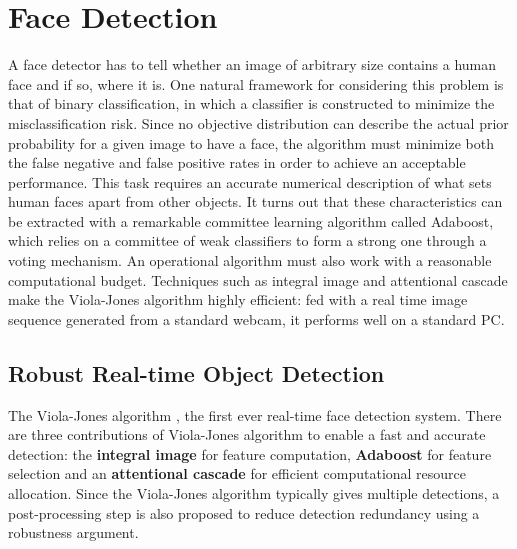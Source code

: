 \chapter{Face Detection} %

\label{Chapter4} %


A face detector has to tell whether an image of arbitrary size contains a human face and if so, where
it is. One natural framework for considering this problem is that of binary classification, in which
a classifier is constructed to minimize the misclassification risk. Since no objective distribution can
describe the actual prior probability for a given image to have a face, the algorithm must minimize
both the false negative and false positive rates in order to achieve an acceptable performance.
This task requires an accurate numerical description of what sets human faces apart from other
objects. It turns out that these characteristics can be extracted with a remarkable committee learning
algorithm called Adaboost, which relies on a committee of weak classifiers to form a strong
one through a voting mechanism. An operational algorithm must also work with a reasonable computational 
budget. Techniques such as integral image and attentional cascade make the Viola-Jones algorithm \cite{Viola2004RRF966432}
highly efficient: fed with a real time image sequence generated from a standard webcam, it performs well on a
standard PC.\cite{ipol.2014.104}

\section{Robust Real-time Object Detection}
The Viola-Jones algorithm  \cite{Viola2004RRF966432}, the first ever real-time face detection system. 
There are three contributions of Viola-Jones algorithm to enable a fast and accurate detection:
the \textbf{integral image} for feature computation, \textbf{Adaboost} for feature selection and an 
\textbf{attentional cascade} for efficient computational resource allocation. 
Since the Viola-Jones algorithm typically gives multiple detections, 
a post-processing step is also proposed to reduce detection redundancy using a robustness argument.\cite{ipol.2014.104}


